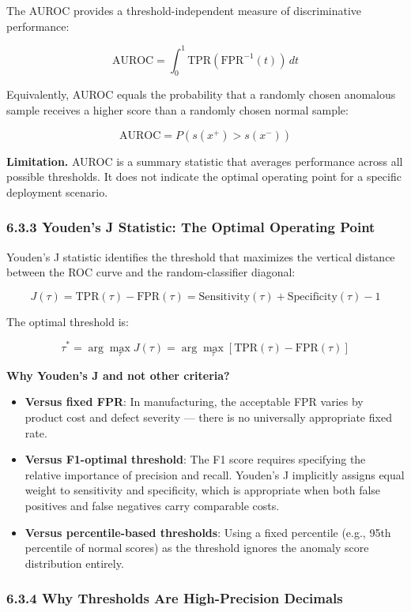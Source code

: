 The AUROC provides a threshold-independent measure of discriminative performance:

\[\text{AUROC} = \int_0^1 \text{TPR}(\text{FPR}^{-1}(t)) \, dt\]

Equivalently, AUROC equals the probability that a randomly chosen anomalous sample receives a higher score than a randomly chosen normal sample:

\[\text{AUROC} = P(s(x^+) > s(x^-))\]

\textbf{Limitation.} AUROC is a summary statistic that averages performance across all possible thresholds. It does not indicate the optimal operating point for a specific deployment scenario.

\subsubsection{6.3.3 Youden's J Statistic: The Optimal Operating Point}\label{youdens-j-statistic-the-optimal-operating-point}

Youden's J statistic identifies the threshold that maximizes the vertical distance between the ROC curve and the random-classifier diagonal:

\[J(\tau) = \text{TPR}(\tau) - \text{FPR}(\tau) = \text{Sensitivity}(\tau) + \text{Specificity}(\tau) - 1\]

The optimal threshold is:

\[\tau^* = \arg\max_\tau J(\tau) = \arg\max_\tau [\text{TPR}(\tau) - \text{FPR}(\tau)]\]

\textbf{Why Youden's J and not other criteria?}

\begin{itemize}
\item
  \textbf{Versus fixed FPR}: In manufacturing, the acceptable FPR varies by product cost and defect severity --- there is no universally appropriate fixed rate.
\item
  \textbf{Versus F1-optimal threshold}: The F1 score requires specifying the relative importance of precision and recall. Youden's J implicitly assigns equal weight to sensitivity and specificity, which is appropriate when both false positives and false negatives carry comparable costs.
\item
  \textbf{Versus percentile-based thresholds}: Using a fixed percentile (e.g., 95th percentile of normal scores) as the threshold ignores the anomaly score distribution entirely.
\end{itemize}

\subsubsection{6.3.4 Why Thresholds Are High-Precision Decimals}\label{why-thresholds-are-high-precision-decimals}

